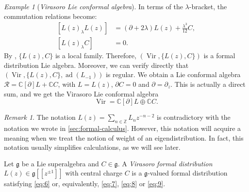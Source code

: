 \documentclass[a4paper, 12pt, reqno]{amsart}
\theoremstyle{remark}
\newtheorem{remark}[theorem]{Remark}
\newtheorem{example}[theorem]{Example}
\numberwithin{equation}{subsection}
\DeclareMathOperator{\Vir}{Vir}
\DeclareMathOperator{\ad}{ad}
\begin{document}
\begin{example}[\emph{Virasoro Lie conformal algebra}]
  In terms of the $\lambda$-bracket, the commutation relations become:
  \begin{equation}
    \label{eq:9}
    \begin{split}
      [L(z)_{\lambda}L(z)] &= (\partial + 2\lambda)L(z) + \frac{\lambda^3}{12}C, \\
      [L(z)_{\lambda}C] &= 0.
    \end{split}
\end{equation}
  By , $\{L(z), C\}$ is a local family.
  Therefore, $(\Vir, \{L(z), C\})$ is a formal distribution Lie algebra.
  Moreover, we can verify directly that $(\Vir, \{L(z), C\}, \ad(L_{-1}))$ is regular.
  We obtain a Lie conformal algebra $\mathcal{R} = \mathbb{C}[\partial]L + \mathbb{C}C$, with $L = L(z)$, $\partial C = 0$ and $\partial = \partial_z$.
  This is actually a direct sum, and we get the Virasoro Lie conformal algebra
  \begin{equation*}
    \Vir = \mathbb{C}[\partial]L \oplus \mathbb{C}C.
  \end{equation*}
\end{example}

\begin{remark}
  \label{rmk:8}
  The notation $L(z) = \sum_{n \in \mathbb{Z}}L_nz^{-n - 2}$ is contradictory with the notation we wrote in \cref{sec:formal-calculus}.
  However, this notation will acquire a meaning when we treat the notion of weight of an eigendistribution.
  In fact, this notation usually simplifies calculations, as we will see later.
\end{remark}

Let $\mathfrak{g}$ be a Lie superalgebra and $C \in \mathfrak{g}$.
A \emph{Virasoro formal distribution} $L(z) \in \mathfrak{g}[[z^{\pm 1}]]$ with central charge $C$ is a $\mathfrak{g}$-valued formal distribution satisfying \eqref{eq:6} or, equivalently, \eqref{eq:7}, \eqref{eq:8} or \eqref{eq:9}.
\end{document}
